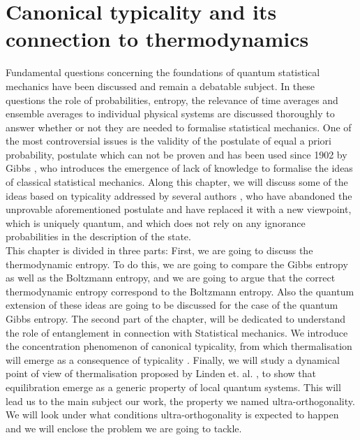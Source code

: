 \chapter{Canonical typicality and its connection to thermodynamics}
Fundamental questions concerning the foundations of quantum statistical mechanics have been discussed and remain a debatable subject\cite{singh_foundations_2013}. In these questions the role of probabilities, entropy, the relevance of time averages and ensemble averages to individual physical systems are discussed thoroughly \cite{gemmer_quantum_2004} to answer whether or not they are needed to formalise statistical mechanics. One of the most controversial issues is the validity of the postulate of equal a priori probability, postulate which can not be proven\cite{singh_foundations_2013} and has been used since 1902 by Gibbs \cite{gibbs_elementary_1902}, who introduces the emergence of lack of knowledge to formalise the ideas of classical statistical mechanics. Along this chapter, we will discuss some of the ideas based on typicality addressed by several authors \cite{gemmer_quantum_2004, goldstein_canonical_2006, popescu_entanglement_2006}, who have abandoned the unprovable aforementioned postulate and have replaced it with a new viewpoint, which is uniquely quantum, and which does not rely on any ignorance probabilities in the description of the state.\\
\indent This chapter is divided in three parts: First, we are going to discuss the thermodynamic entropy. To do this, we are going to compare the Gibbs entropy as well as the Boltzmann entropy, and we are going to argue that the correct thermodynamic entropy correspond to the Boltzmann entropy. Also the quantum extension of these ideas are going to be discussed for the case of the quantum Gibbs entropy. The second part of the chapter, will be dedicated to understand the role of entanglement in connection with Statistical mechanics. We introduce the concentration phenomenon of canonical typicality, from which thermalisation will emerge as a consequence of typicality \cite{popescu_entanglement_2006, popescu_foundations_2005}. Finally, we will study a dynamical point of view of thermalisation proposed by Linden et. al. \cite{linden_quantum_2009}, to show that equilibration emerge as a generic property of local quantum systems. This will lead us to the main subject our work, the property we named ultra-orthogonality. We will look under what conditions ultra-orthogonality is expected to happen and we will enclose the problem we are going to tackle.

